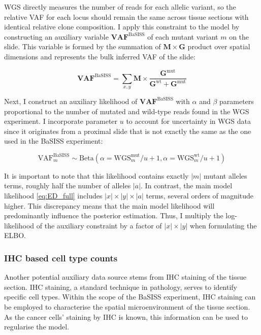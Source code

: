 \ac{WGS} directly measures the number of reads for each allelic variant, so the relative \acf{VAF} for each locus should remain the same across tissue sections with identical relative clone composition. I apply this constraint to the model by constructing an auxiliary variable $\mathbf{VAF}^{\text{BaSISS}}$ of each mutant variant $m$ on the slide. This variable is formed by the summation of $\mathbf{M} \times \mathbf{G}$ product over spatial dimensions and represents the bulk inferred \ac{VAF} of the slide:

\begin{equation} 
\mathbf{VAF}^{\text{BaSISS}} = \sum_{x,y} \mathbf{M} \times \dfrac{\mathbf{G}^{\text{mut}}}{\mathbf{G}^{\text{wt}} + \mathbf{G}^{\text{mut}}}
\end{equation}

Next, I construct an auxiliary likelihood of $\mathbf{VAF}^{\text{BaSISS}}$ with $\alpha$ and $\beta$ parameters proportional to the number of mutated and wild-type reads found in the \ac{WGS} experiment. I incorporate parameter $u$ to account for uncertainty in \ac{WGS} data since it originates from a proximal slide that is not exactly the same as the one used in the BaSISS experiment:

\begin{equation} 
    \text{VAF}^{\text{BaSISS}}_m \sim \mathrm{Beta}(\alpha=\text{WGS}^\text{mut}_m / u + 1, \alpha=\text{WGS}^\text{wt}_m / u + 1)
\end{equation}

It is important to note that this likelihood contains exactly $|m|$ mutant alleles terms, roughly half the number of alleles $|a|$. In contrast, the main model likelihood \cref{eq:ED_full} includes $|x| \times |y| \times |a|$ terms, several orders of magnitude higher. This discrepancy means that the main model likelihood will predominantly influence the posterior estimation. Thus, I multiply the log-likelihood of the auxiliary constraint by a factor of $|x| \times |y|$ when formulating the \ac{ELBO}.

\subsubsection*{\acl{IHC} based cell type counts}

Another potential auxiliary data source stems from \ac{IHC} staining of the tissue section. \ac{IHC} staining, a standard technique in pathology, serves to identify specific cell types. Within the scope of the \ac{BaSISS} experiment, \ac{IHC} staining can be employed to characterise the spatial microenvironment of the tissue section. As the cancer cells' staining by \ac{IHC} is known, this information can be used to regularise the model.

